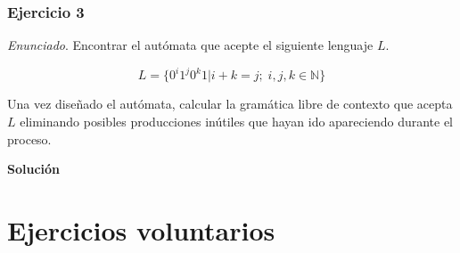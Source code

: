 \documentclass[11pt,a4paper]{article}
\newcommand{\enu}{\textit{Enunciado}}
\newcommand{\sol}{\textbf{Solución}}
\begin{document}
		\subsubsection{Ejercicio 3}
		\enu. Encontrar el autómata que acepte el siguiente lenguaje $L$.
		
		\[L = \lbrace 0^i 1^j 0^k 1 | i + k = j; \; i, j, k \in \mathbb{N} \rbrace\]
		
		Una vez diseñado el autómata, calcular la gramática libre de contexto que acepta $L$ eliminando posibles producciones
		inútiles que hayan ido apareciendo durante el proceso. \par
		
		\sol \par
		
	\newpage
	\section{Ejercicios voluntarios}
\end{document}
